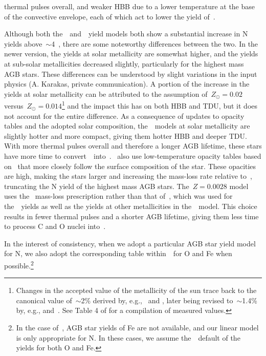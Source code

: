 \documentclass[ms.tex]{subfiles}
\begin{document}
thermal pulses overall, and weaker HBB due to a lower temperature at the base
of the convective envelope, each of which act to lower the yield of~\Nfourteen.
\par
Although both the~\karakasten~and~\karakas~yield models both show a substantial
increase in N yields above~$\sim$4~\msun, there are some noteworthy differences
between the two.
In the newer version, the yields at solar metallicity are somewhat higher,
and the yields at sub-solar metallicities decreased slightly, particularly for
the highest mass AGB stars.
These differences can be understood by slight variations in the input physics
(A. Karakas, private communication).
A portion of the increase in the yields at solar metallicity can be attributed
to the assumption of~$Z_\odot = 0.02$ versus~$Z_\odot = 0.014$\footnote{
	Changes in the accepted value of the metallicity of the sun trace back to
	the canonical value of~$\sim$2\% derived by, e.g.,~\citet{Anders1989} and
	\citet{Grevesse1998}, later being revised to~$\sim$1.4\% by, e.g.,
	\citet{Lodders2003} and~\citet*{Asplund2005}. See Table 4 of
	\citet{Asplund2009} for a compilation of measured values.
} and the impact this has on both HBB and TDU, but it does not account for the
entire difference.
As a consequence of updates to opacity tables and the adopted solar composition,
the~\karakas~models at solar metallicity are slightly hotter and more compact,
giving them hotter HBB and deeper TDU.
With more thermal pulses overall and therefore a longer AGB lifetime, these
stars have more time to convert~\Ctwelve~into~\Nfourteen.
\karakas~also use low-temperature opacity tables based on~\citet{Marigo2002}
that more closely follow the surface composition of the star.
These opacities are high, making the stars larger and increasing the
mass-loss rate relative to~\karakasten, truncating the N yield of the highest
mass AGB stars.
The~$Z = 0.0028$ model uses the~\citet{Bloecker1995} mass-loss prescription
rather than that of~\citet{Vassiliadis1993}, which was used for
the~\karakasten~yields as well as the yields at other metallicities in
the~\karakas~model.
This choice results in fewer thermal pulses and a shorter AGB lifetime, giving
them less time to process C and O nuclei into~\Nfourteen.
\par
In the interest of consistency, when we adopt a particular AGB star yield model
for N, we also adopt the corresponding table within~\vice~for O and Fe when
possible.\footnote{
	In the case of~\citet{Ventura2013, Ventura2014, Ventura2018, Ventura2020},
	AGB star yields of Fe are not available, and our linear model is only
	appropriate for N.
	In these cases, we assume the~\vice~default of the~\citet{Cristallo2011,
	Cristallo2015} yields for both O and Fe.
}
\end{document}
